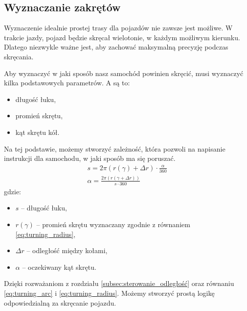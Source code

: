     \subsection{Wyznaczanie zakrętów}
        Wyznaczenie idealnie prostej trasy dla pojazdów nie zawsze jest możliwe.
        W trakcie jazdy, pojazd będzie skręcał wielotonie, w każdym możliwym kierunku.
        Dlatego niezwykle ważne jest, aby zachować maksymalną precyzję podczas skręcania.

        Aby wyznaczyć w jaki sposób nasz samochód powinien skręcić, musi wyznaczyć kilka podstawowych parametrów.
        A są to:
        \begin{itemize}
            \item długość łuku,
            \item promień skrętu,
            \item kąt skrętu kół.
        \end{itemize}
        Na tej podstawie, możemy stworzyć zależność, która pozwoli na napisanie instrukcji dla samochodu, w jaki sposób ma się poruszać.
        \begin{gather}
            s = 2\pi (r(\gamma) + \Delta r) \cdot \frac{\alpha}{360}
            \label{eq:turning_arc}
            \\
            \alpha = \frac{2\pi (r(\gamma + \Delta r))}{s \cdot 360}
        \end{gather}
        gdzie:
        \begin{itemize}
            \item $s$ -- długość łuku,
            \item $r(\gamma)$ -- promień skrętu wyznaczany zgodnie z równaniem \eqref{eq:turning_radius},
            \item $\Delta r$ -- odległość między kołami,
            \item $\alpha$ -- oczekiwany kąt skrętu.
        \end{itemize}

        Dzięki rozważaniom z rozdziału \ref{subsec:sterowanie_odległość} oraz równaniu \eqref{eq:turning_arc} i \eqref{eq:turning_radius}.
        Możemy stworzyć prostą logikę odpowiedzialną za skręcanie pojazdu.



